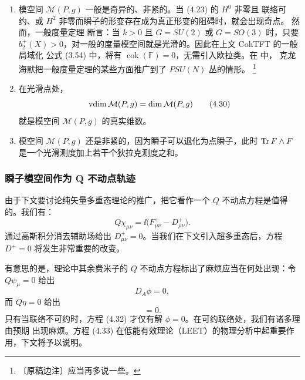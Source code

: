 \begin{enumerate}[label=\arabic*., leftmargin=2.2em]
  \item 模空间 $\mathcal{M}(P,g)$ 一般是奇异的、非紧的。当 (4.23) 的 $H^{0}$ 非零且
    联络可约、或 $H^{2}$ 非零而瞬子的形变存在成为真正形变的阻碍时，就会出现奇点。
    然而，一般度量定理 \cite{ref15} 断言：当 $k>0$ 且 $G=SU(2)$ 或 $G=SO(3)$ 时，只要
    $b_{2}^{+}(X)>0$，对一般的度量模空间就是光滑的。因此在上文 CohTFT 的一般局域化
    公式 (3.54) 中，将有 $\operatorname{cok}(\mathbb{F})=0$，无需引入欧拉类。在 \cite{ref22} 中，
    克龙海默把一般度量定理的某些方面推广到了 $PSU(N)$ 丛的情形。
    \footnote{〔原稿边注〕应当再多说一些。}

  \item 在光滑点处，
    \begin{equation}
      \operatorname{vdim}\mathcal{M}(P,g)=\dim\mathcal{M}(P,g)
      \tag{4.30}
    \end{equation}
    就是模空间 $\mathcal{M}(P,g)$ 的真实维数。

  \item 模空间 $\mathcal{M}(P,g)$ 还是非紧的，因为瞬子可以退化为点瞬子，此时
    $\operatorname{Tr} F\wedge F$ 是一个光滑测度加上若干个狄拉克测度之和。
\end{enumerate}

\subsubsection{瞬子模空间作为 Q 不动点轨迹}
\label{sec:4-3-4}

由于下文要讨论纯矢量多重态理论的推广，把它看作一个 $Q$ 不动点方程是值得的。我们有：
\begin{equation}
  Q\chi_{\mu\nu}=\ii\bigl(F^{+}_{\mu\nu}-D^{+}_{\mu\nu}\bigr).
  \tag{4.31}
\end{equation}
通过高斯积分消去辅助场给出 $D^{+}_{\mu\nu}=0$。当我们在下文引入超多重态后，方程
$D^{+}=0$ 将发生非常重要的改变。

有意思的是，理论中其余费米子的 $Q$ 不动点方程标出了麻烦应当在何处出现：令
$Q\psi_{\mu}=0$ 给出
\begin{equation}
  D_{A}\phi=0,
  \tag{4.32}
\end{equation}
而 $Q\eta=0$ 给出
\begin{equation}
  [\bar\phi,\phi]=0.
  \tag{4.33}
\end{equation}
只有当联络不可约时，方程 (4.32) 才仅有解 $\phi=0$。在可约联络处，我们有诸多理由预期
出现麻烦。方程 (4.33) 在低能有效理论（LEET）的物理分析中起重要作用，下文将予以说明。

